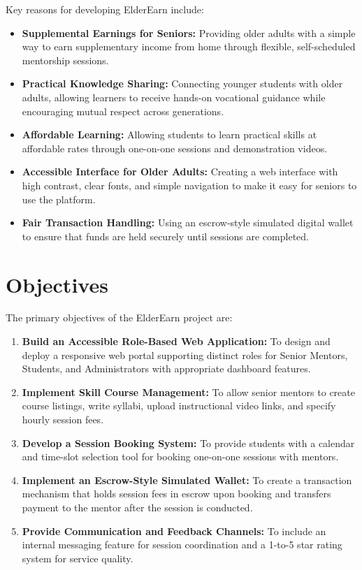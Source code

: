 \documentclass[12pt,a4paper]{report}
\begin{document}
Key reasons for developing ElderEarn include:
\begin{itemize}[leftmargin=1.5em, itemsep=2pt]
  \item \textbf{Supplemental Earnings for Seniors:} Providing older adults with a simple way to earn supplementary income from home through flexible, self-scheduled mentorship sessions.
  \item \textbf{Practical Knowledge Sharing:} Connecting younger students with older adults, allowing learners to receive hands-on vocational guidance while encouraging mutual respect across generations.
  \item \textbf{Affordable Learning:} Allowing students to learn practical skills at affordable rates through one-on-one sessions and demonstration videos.
  \item \textbf{Accessible Interface for Older Adults:} Creating a web interface with high contrast, clear fonts, and simple navigation to make it easy for seniors to use the platform.
  \item \textbf{Fair Transaction Handling:} Using an escrow-style simulated digital wallet to ensure that funds are held securely until sessions are completed.
\end{itemize}

\section{Objectives}
The primary objectives of the ElderEarn project are:
\begin{enumerate}[leftmargin=1.5em, itemsep=2pt]
  \item \textbf{Build an Accessible Role-Based Web Application:} To design and deploy a responsive web portal supporting distinct roles for Senior Mentors, Students, and Administrators with appropriate dashboard features.
  \item \textbf{Implement Skill Course Management:} To allow senior mentors to create course listings, write syllabi, upload instructional video links, and specify hourly session fees.
  \item \textbf{Develop a Session Booking System:} To provide students with a calendar and time-slot selection tool for booking one-on-one sessions with mentors.
  \item \textbf{Implement an Escrow-Style Simulated Wallet:} To create a transaction mechanism that holds session fees in escrow upon booking and transfers payment to the mentor after the session is conducted.
  \item \textbf{Provide Communication and Feedback Channels:} To include an internal messaging feature for session coordination and a 1-to-5 star rating system for service quality.
\end{enumerate}
\end{document}
